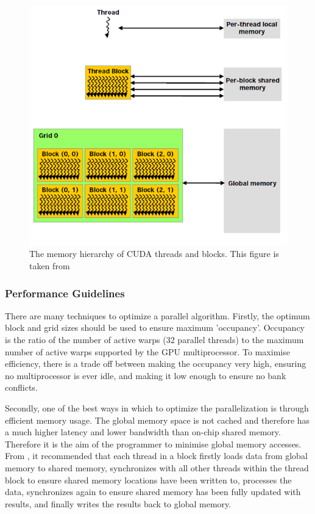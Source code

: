 \begin{figure}[p]
	\centering
		\includegraphics[scale=0.4]{images/cudamemory.PNG}
		\caption{The memory hierarchy of CUDA threads and blocks. This figure is taken from \cite{cuda}}
	\label{fig:cudamemory}
\end{figure}

		\subsubsection{Performance Guidelines}
There are many techniques to optimize a parallel algorithm. Firstly, the optimum block and grid sizes should be used to ensure maximum 'occupancy'. Occupancy is the ratio of the number of active warps (32 parallel threads) to the maximum number of active warps supported by the GPU multiprocessor. To maximise efficiency, there is a trade off between making the occupancy very high, ensuring no multiprocessor is ever idle, and making it low enough to ensure no bank conflicts.

Secondly, one of the best ways in which to optimize the parallelization is through efficient memory usage. The global memory space is not cached and therefore has a much higher latency and lower bandwidth than on-chip shared memory. Therefore it is the aim of the programmer to minimise global memory accesses. From \cite{cuda}, it recommended that each thread in a block firstly loads data from global memory to shared memory, synchronizes with all other threads within the thread block to ensure shared memory locations have been written to, processes the data, synchronizes again to ensure shared memory has been fully updated with results, and finally writes the results back to global memory.

